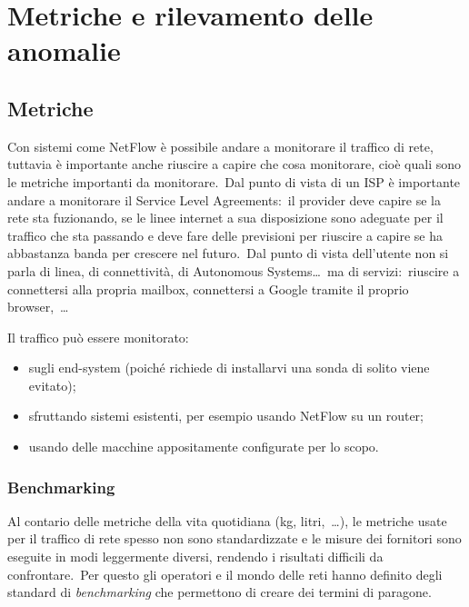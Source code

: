\chapter{Metriche e rilevamento delle anomalie}

\section{Metriche}

Con sistemi come NetFlow è possibile andare a monitorare il traffico di rete, tuttavia è importante anche riuscire a capire che cosa monitorare, cioè quali sono le metriche importanti da monitorare.\
Dal punto di vista di un ISP è importante andare a monitorare il Service Level Agreements:\ il provider deve capire se la rete sta fuzionando, se le linee internet a sua disposizione sono adeguate per il traffico che sta passando e deve fare delle previsioni per riuscire a capire se ha abbastanza banda per crescere nel futuro.\
Dal punto di vista dell'utente non si parla di linea, di connettività, di Autonomous Systems\dots\ ma di servizi:\ riuscire a connettersi alla propria mailbox, connettersi a Google tramite il proprio browser,\ \dots

Il traffico può essere monitorato:
\begin{itemize}
    \item sugli end-system (poiché richiede di installarvi una sonda di solito viene evitato);
    \item sfruttando sistemi esistenti, per esempio usando NetFlow su un router;
    \item usando delle macchine appositamente configurate per lo scopo.
\end{itemize}

\subsection{Benchmarking}

Al contario delle metriche della vita quotidiana (kg, litri,\ \dots), le metriche usate per il traffico di rete spesso non sono standardizzate e le misure dei fornitori sono eseguite in modi leggermente diversi, rendendo i risultati difficili da confrontare.\
Per questo gli operatori e il mondo delle reti hanno definito degli standard di \textit{benchmarking} che permettono di creare dei termini di paragone.\

